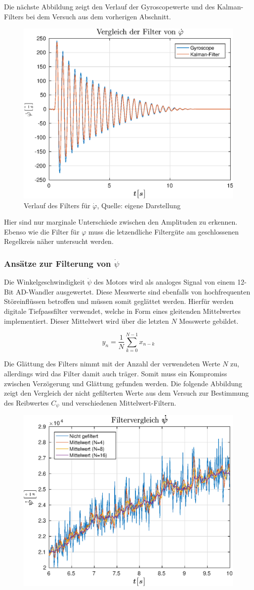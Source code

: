 Die nächste Abbildung zeigt den Verlauf der Gyroscopewerte und des Kalman-Filters bei dem Versuch aus dem vorherigen Abschnitt.
\begin{figure}[!h]
\centering
\includegraphics[width=0.5\linewidth]{img/filtervergleich_phi__d}
\caption{Verlauf des Filters für $\dot{\varphi}$, Quelle: eigene Darstellung}
\end{figure}
Hier sind nur marginale Unterschiede zwischen den Amplituden zu erkennen. Ebenso wie die Filter für $\varphi$ muss die letzendliche Filtergüte am geschlossenen Regelkreis näher untersucht werden.

\newpage
\subsubsection{Ansätze zur Filterung von $\dot{\psi}$}
Die Winkelgeschwindigkeit $\dot{\psi}$ des Motors wird als analoges Signal von einem 12-Bit AD-Wandler ausgewertet. Diese Messwerte sind ebenfalls von hochfrequenten Störeinflüssen betroffen und müssen somit geglättet werden. Hierfür werden digitale Tiefpassfilter verwendet, welche in Form eines gleitenden Mittelwertes implementiert. Dieser Mittelwert wird über die letzten $N$ Messwerte gebildet. 

\begin{equation}
y_n = \frac{1}{N}\sum^{N-1}_{k=0} x_{n-k}
\end{equation}

Die Glättung des Filters nimmt mit der Anzahl der verwendeten Werte $N$ zu, allerdings wird das Filter damit auch träger. Somit muss ein Kompromiss zwischen Verzögerung und Glättung gefunden werden. Die folgende Abbildung zeigt den Vergleich der nicht gefilterten Werte aus dem Versuch zur Bestimmung des Reibwertes $C_{\psi}$ und verschiedenen Mittelwert-Filtern. 

\begin{figure}[!h]
\centering
\includegraphics[width=0.6\linewidth]{img/filtervergleich_psi__d}
\end{figure}

